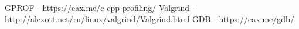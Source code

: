 \begin{thebibliography}{99}
GPROF - https://eax.me/c-cpp-profiling/
Valgrind - http://alexott.net/ru/linux/valgrind/Valgrind.html
GDB - https://eax.me/gdb/
\end{thebibliography}
\pagebreak

